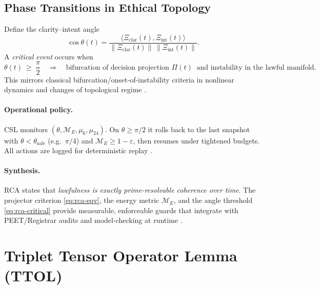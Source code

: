 \documentclass[12pt]{amsart}
\theoremstyle{plain}
\begin{document}
\subsection{Phase Transitions in Ethical Topology}
Define the clarity–intent angle
\[
\cos\theta(t)=\frac{\langle \Xi_{\mathrm{clar}}(t),\Xi_{\mathrm{int}}(t)\rangle}{\|\Xi_{\mathrm{clar}}(t)\|\,\|\Xi_{\mathrm{int}}(t)\|}.
\]
A \emph{critical event} occurs when
\begin{equation}
\theta(t)\ \ge\ \frac{\pi}{2}\quad\Longrightarrow\quad\text{bifurcation of decision projection }\Pi(t)\ \text{ and instability in the lawful manifold.}
\label{eq:rca-critical}
\end{equation}
This mirrors classical bifurcation/onset-of-instability criteria in nonlinear dynamics and changes of topological regime \cite{khalil2002nonlinear,nash1983topology}. 

\paragraph{Operational policy.}
CSL monitors $(\theta,\mathcal{M}_E,\mu_6,\mu_{24})$. On $\theta\ge \pi/2$ it rolls back to the last snapshot with $\theta<\theta_{\mathrm{safe}}$ (e.g.\ $\pi/4$) and $\mathcal{M}_E\ge 1-\varepsilon$, then resumes under tightened budgets. All actions are logged for deterministic replay \cite{schneider2000enforceable}.

\paragraph{Synthesis.}
RCA states that \emph{lawfulness is exactly prime-resolvable coherence over time}. The projector criterion \eqref{eq:rca-eqv}, the energy metric $\mathcal{M}_E$, and the angle threshold \eqref{eq:rca-critical} provide measurable, enforceable guards that integrate with PEET/Registrar audits and model-checking at runtime \cite{cover2006elements,clarke1999model,baier2008model}.

\section{Triplet Tensor Operator Lemma (TTOL)}
\end{document}
